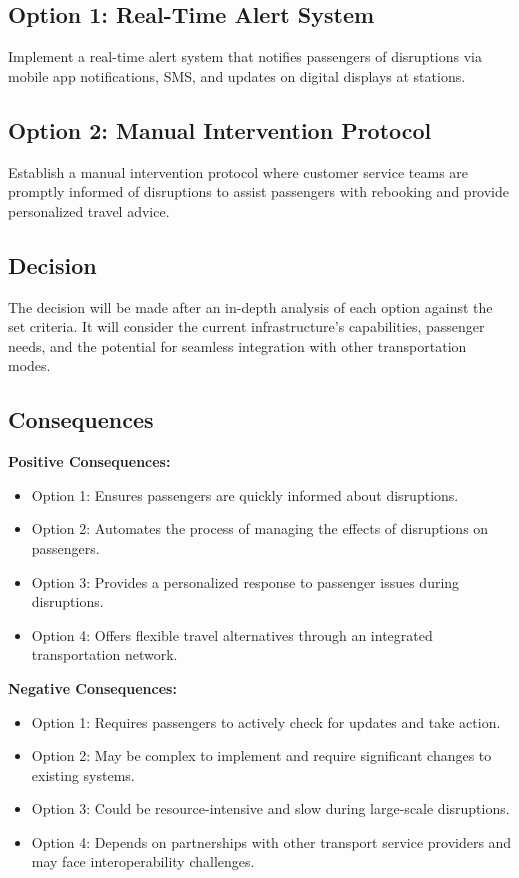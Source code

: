 \subsection*{Option 1: Real-Time Alert System}
Implement a real-time alert system that notifies passengers of disruptions via mobile app notifications, SMS, and updates on digital displays at stations.

\subsection*{Option 2: Manual Intervention Protocol}
Establish a manual intervention protocol where customer service teams are promptly informed of disruptions to assist passengers with rebooking and provide personalized travel advice.

\subsection*{Decision}
The decision will be made after an in-depth analysis of each option against the set criteria. It will consider the current infrastructure's capabilities, passenger needs, and the potential for seamless integration with other transportation modes.

\subsection*{Consequences}
\textbf{Positive Consequences:}
\begin{itemize}
    \item Option 1: Ensures passengers are quickly informed about disruptions.
    \item Option 2: Automates the process of managing the effects of disruptions on passengers.
    \item Option 3: Provides a personalized response to passenger issues during disruptions.
    \item Option 4: Offers flexible travel alternatives through an integrated transportation network.
\end{itemize}
\textbf{Negative Consequences:}
\begin{itemize}
    \item Option 1: Requires passengers to actively check for updates and take action.
    \item Option 2: May be complex to implement and require significant changes to existing systems.
    \item Option 3: Could be resource-intensive and slow during large-scale disruptions.
    \item Option 4: Depends on partnerships with other transport service providers and may face interoperability challenges.
\end{itemize}
